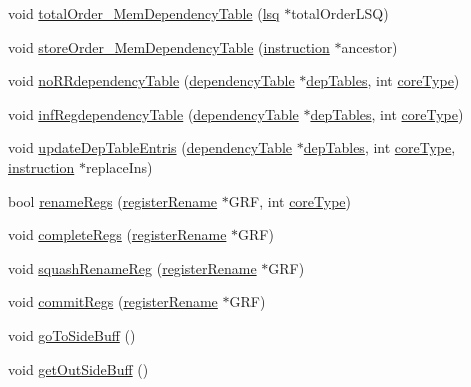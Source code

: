 \begin{DoxyCompactItemize}
\item 
void \hyperlink{classinstruction_a939213a50cdd3a5e31f6d543d5408b15}{totalOrder\_\-MemDependencyTable} (\hyperlink{classlsq}{lsq} $\ast$totalOrderLSQ)
\item 
void \hyperlink{classinstruction_ab817675ba27852b024c813bb5387b058}{storeOrder\_\-MemDependencyTable} (\hyperlink{classinstruction}{instruction} $\ast$ancestor)
\item 
void \hyperlink{classinstruction_a096c7696da9989235116d28996b34143}{noRRdependencyTable} (\hyperlink{classdependencyTable}{dependencyTable} $\ast$\hyperlink{vliwScheduler_8cpp_ab1dae06b10269a1b683512c8ecb25def}{depTables}, int \hyperlink{vliwScheduler_8cpp_a617ce1763c0446f48a6d3a158d507f46}{coreType})
\item 
void \hyperlink{classinstruction_ab04c4389f9057613f1ca69d89509f531}{infRegdependencyTable} (\hyperlink{classdependencyTable}{dependencyTable} $\ast$\hyperlink{vliwScheduler_8cpp_ab1dae06b10269a1b683512c8ecb25def}{depTables}, int \hyperlink{vliwScheduler_8cpp_a617ce1763c0446f48a6d3a158d507f46}{coreType})
\item 
void \hyperlink{classinstruction_a8ef95c2bb6b131c4ce3f33cfc124c748}{updateDepTableEntris} (\hyperlink{classdependencyTable}{dependencyTable} $\ast$\hyperlink{vliwScheduler_8cpp_ab1dae06b10269a1b683512c8ecb25def}{depTables}, int \hyperlink{vliwScheduler_8cpp_a617ce1763c0446f48a6d3a158d507f46}{coreType}, \hyperlink{classinstruction}{instruction} $\ast$replaceIns)
\item 
bool \hyperlink{classinstruction_a6dfbd578c46bb88f5b7ac61b74b7fba4}{renameRegs} (\hyperlink{classregisterRename}{registerRename} $\ast$GRF, int \hyperlink{vliwScheduler_8cpp_a617ce1763c0446f48a6d3a158d507f46}{coreType})
\item 
void \hyperlink{classinstruction_a9b291777fca7e332002d3509c448afe6}{completeRegs} (\hyperlink{classregisterRename}{registerRename} $\ast$GRF)
\item 
void \hyperlink{classinstruction_a9860d38bd4eed33f9047b7829173d183}{squashRenameReg} (\hyperlink{classregisterRename}{registerRename} $\ast$GRF)
\item 
void \hyperlink{classinstruction_a5f510bd70b679028a0a343c91558552d}{commitRegs} (\hyperlink{classregisterRename}{registerRename} $\ast$GRF)
\item 
void \hyperlink{classinstruction_af0d1e76bd95a84ef5629548391264b4e}{goToSideBuff} ()
\item 
void \hyperlink{classinstruction_a081e816b22818a5d9b150678c29d64b3}{getOutSideBuff} ()

\end{DoxyCompactItemize}
